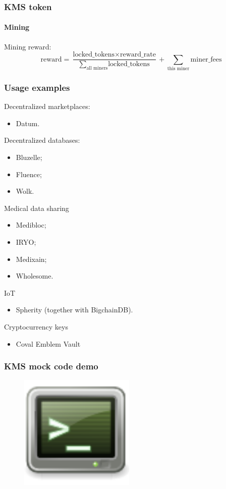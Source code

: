 \documentclass[xetex,mathsans,sans,aspectratio=169]{beamer}
\begin{document}
    \begin{frame}
        \frametitle{KMS token}
        \framesubtitle{Mining}
        Mining reward:
        $$\text{reward} = \frac{\text{locked\_tokens} \times \text{reward\_rate}}{\sum_{\text{all miners}} {\text{locked\_tokens}}} + \sum_{\text{this miner}} {\text{miner\_fees}}$$
    \end{frame}

    \begin{frame}
        \frametitle{Usage examples}
        Decentralized marketplaces:
        \begin{itemize}
            \item Datum.
        \end{itemize}
        Decentralized databases:
        \begin{itemize}
            \item Bluzelle;
            \item Fluence;
            \item Wolk.
        \end{itemize}
        Medical data sharing
        \begin{itemize}
            \item Medibloc;
            \item IRYO;
            \item Medixain;
            \item Wholesome.
        \end{itemize}
        IoT
        \begin{itemize}
            \item Spherity (together with BigchainDB).
        \end{itemize}
        Cryptocurrency keys
        \begin{itemize}
            \item Coval Emblem Vault
        \end{itemize}
    \end{frame}

    \begin{frame}
        \frametitle{KMS mock code demo}
        \begin{figure}
            \centering
            \includegraphics[height=5.5cm]{pdf/terminal.pdf}
        \end{figure}
    \end{frame}
\end{document}
